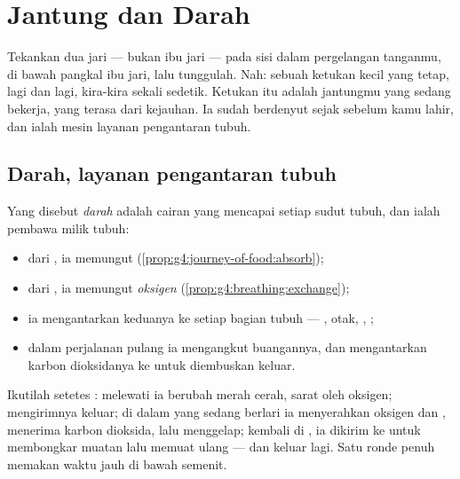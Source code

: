 \chapter{Jantung dan Darah}\label{ch:g4:heart-and-blood}

Tekankan dua jari --- bukan ibu jari --- pada sisi dalam pergelangan
tanganmu, di bawah pangkal ibu jari, lalu tunggulah. Nah: sebuah
ketukan kecil yang tetap, lagi dan lagi, kira-kira sekali sedetik.
Ketukan itu adalah jantungmu yang sedang bekerja, yang terasa dari
kejauhan. Ia sudah berdenyut sejak sebelum kamu lahir, dan ialah mesin
layanan pengantaran tubuh.

\section{Darah, layanan pengantaran tubuh}

\begin{proposition}\label{prop:g4:heart-and-blood:carries}
Yang disebut \emph{darah} adalah cairan yang mencapai
setiap sudut tubuh, dan ialah pembawa milik tubuh:
\begin{itemize}
  \item dari , ia memungut \emph{}
        (\cref{prop:g4:journey-of-food:absorb});
  \item dari , ia memungut \emph{oksigen}
        (\cref{prop:g4:breathing:exchange});
  \item ia mengantarkan keduanya ke setiap bagian tubuh --- ,
        otak, , ;
  \item dalam perjalanan pulang ia mengangkut buangannya, dan
        mengantarkan karbon dioksidanya ke  untuk diembuskan
        keluar.
\end{itemize}
\end{proposition}
\admitted

\begin{example}\label{ex:g4:heart-and-blood:round}
Ikutilah setetes : melewati  ia berubah merah cerah,
sarat oleh oksigen;  mengirimnya keluar; di dalam 
 yang sedang berlari ia menyerahkan oksigen dan ,
menerima karbon dioksida, lalu menggelap; kembali di , ia
dikirim ke  untuk membongkar muatan lalu memuat ulang --- dan
keluar lagi. Satu ronde penuh memakan waktu jauh di bawah semenit.
\end{example}


